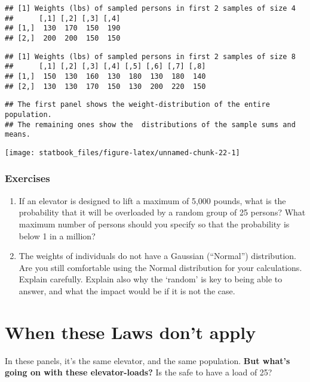 \documentclass[]{book}
\begin{document}
\begin{verbatim}
## [1] Weights (lbs) of sampled persons in first 2 samples of size 4
##      [,1] [,2] [,3] [,4]
## [1,]  130  170  150  190
## [2,]  200  200  150  150
\end{verbatim}

\begin{verbatim}
## [1] Weights (lbs) of sampled persons in first 2 samples of size 8
##      [,1] [,2] [,3] [,4] [,5] [,6] [,7] [,8]
## [1,]  150  130  160  130  180  130  180  140
## [2,]  130  130  170  150  130  200  220  150
\end{verbatim}

\begin{verbatim}
## The first panel shows the weight-distribution of the entire population.
## The remaining ones show the  distributions of the sample sums and means.
\end{verbatim}

\begin{center}\texttt{[image: statbook\_files/figure-latex/unnamed-chunk-22-1]} \end{center}

\hypertarget{exercises-3}{%
\subsubsection{Exercises}\label{exercises-3}}

\begin{enumerate}
\def\labelenumi{\arabic{enumi}.}
\item
  If an elevator is designed to lift a maximum of 5,000 pounds, what is the probability that it will be overloaded by a random group of 25 persons? What maximum number of persons should you specify so that the probability is below 1 in a million?
\item
  The weights of individuals do not have a Gaussian (``Normal'') distribution. Are you still comfortable using the Normal distribution for your calculations. Explain carefully. Explain also why the `random' is key to being able to answer, and what the impact would be if it is not the case.
\end{enumerate}

\hypertarget{when-these-laws-dont-apply}{%
\section{When these Laws don't apply}\label{when-these-laws-dont-apply}}

In these panels, it's the same elevator, and the same population. \textbf{But what's going on with these elevator-loads?} Is the safe to have a load of 25?
\end{document}
